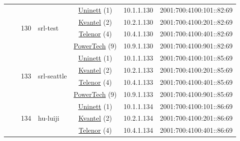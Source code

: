 \begin{small}
\begin{center}
\begin{longtable}{|c|c|c|c|c|c|c|c|}
  &  & \multirow{4}{*}{\tiny{130}} & \multicolumn{1}{|l|}{\multirow{4}{*}{\tiny{srl-test}}} & \multicolumn{2}{|c|}{\tiny{\href{https://www.uninett.no}{Uninett} (1)}} & \tiny{10.1.1.130} & \tiny{2001:700:4100:101::82:69} \\* \cline{5-5}\cline{6-6}\cline{7-7}\cline{8-8}
  &  &  &  & \multicolumn{2}{|c|}{\tiny{\href{http://kvantel.no}{Kvantel} (2)}} & \tiny{10.2.1.130} & \tiny{2001:700:4100:201::82:69} \\* \cline{5-5}\cline{6-6}\cline{7-7}\cline{8-8}
  &  &  &  & \multicolumn{2}{|c|}{\tiny{\href{https://www.telenor.no}{Telenor} (4)}} & \tiny{10.4.1.130} & \tiny{2001:700:4100:401::82:69} \\* \cline{5-5}\cline{6-6}\cline{7-7}\cline{8-8}
  &  &  &  & \multicolumn{2}{|c|}{\tiny{\href{http://www.powertech.no}{PowerTech} (9)}} & \tiny{10.9.1.130} & \tiny{2001:700:4100:901::82:69} \\* \cline{3-3}\cline{4-4}\cline{5-5}\cline{6-6}\cline{7-7}\cline{8-8}
  &  & \multirow{4}{*}{\tiny{133}} & \multicolumn{1}{|l|}{\multirow{4}{*}{\tiny{srl-seattle}}} & \multicolumn{2}{|c|}{\tiny{\href{https://www.uninett.no}{Uninett} (1)}} & \tiny{10.1.1.133} & \tiny{2001:700:4100:101::85:69} \\* \cline{5-5}\cline{6-6}\cline{7-7}\cline{8-8}
  &  &  &  & \multicolumn{2}{|c|}{\tiny{\href{http://kvantel.no}{Kvantel} (2)}} & \tiny{10.2.1.133} & \tiny{2001:700:4100:201::85:69} \\* \cline{5-5}\cline{6-6}\cline{7-7}\cline{8-8}
  &  &  &  & \multicolumn{2}{|c|}{\tiny{\href{https://www.telenor.no}{Telenor} (4)}} & \tiny{10.4.1.133} & \tiny{2001:700:4100:401::85:69} \\* \cline{5-5}\cline{6-6}\cline{7-7}\cline{8-8}
  &  &  &  & \multicolumn{2}{|c|}{\tiny{\href{http://www.powertech.no}{PowerTech} (9)}} & \tiny{10.9.1.133} & \tiny{2001:700:4100:901::85:69} \\* \cline{3-3}\cline{4-4}\cline{5-5}\cline{6-6}\cline{7-7}\cline{8-8}
  &  & \multirow{4}{*}{\tiny{134}} & \multicolumn{1}{|l|}{\multirow{4}{*}{\tiny{hu-luiji}}} & \multicolumn{2}{|c|}{\tiny{\href{https://www.uninett.no}{Uninett} (1)}} & \tiny{10.1.1.134} & \tiny{2001:700:4100:101::86:69} \\* \cline{5-5}\cline{6-6}\cline{7-7}\cline{8-8}
  &  &  &  & \multicolumn{2}{|c|}{\tiny{\href{http://kvantel.no}{Kvantel} (2)}} & \tiny{10.2.1.134} & \tiny{2001:700:4100:201::86:69} \\* \cline{5-5}\cline{6-6}\cline{7-7}\cline{8-8}
  &  &  &  & \multicolumn{2}{|c|}{\tiny{\href{https://www.telenor.no}{Telenor} (4)}} & \tiny{10.4.1.134} & \tiny{2001:700:4100:401::86:69} \\* \cline{5-5}\cline{6-6}\cline{7-7}\cline{8-8}

\end{longtable}
\end{center}
\end{small}
